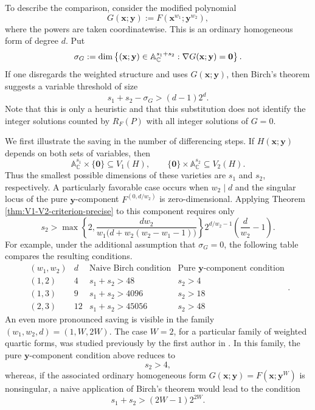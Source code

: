 \documentclass[12pt,reqno]{amsart}
\theoremstyle{definition}
\theoremstyle{remark}
\numberwithin{equation}{section}
\def\bfx{{\mathbf x}}
\def\bfy{{\mathbf y}}
\def\C{{\mathbb C}}\def\D{{\mathbb D}}
\def\A{{\mathbb A}}
\begin{document}
To describe the comparison, consider the modified polynomial
\[
G(\bfx;\bfy):=F(\bfx^{w_1};\bfy^{w_2}),
\]
where the powers are taken coordinatewise.  This is an ordinary homogeneous
form of degree $d$. Put
\[
\sigma_G:=
\dim\left\{(\bfx;\bfy)\in\A_{\C}^{s_1+s_2}:
\nabla G(\bfx;\bfy)=\bf0\right\}.
\]
If one disregards the weighted structure and uses $G(\bfx;\bfy)$, then
Birch's theorem suggests a variable threshold of size
\[
    s_1+s_2-\sigma_G>(d-1)2^d.
\]
Note that this is only a heuristic and that this substitution does not identify the integer
solutions counted by $R_F(P)$ with all integer solutions of $G=0$.

We first illustrate the saving in the number of differencing steps. If
$H(\bfx;\bfy)$ depends on both sets of variables, then
\[
\A_{\C}^{s_1}\times\{\mathbf 0\}\subseteq V_1(H),
\qquad
\{\mathbf 0\}\times\A_{\C}^{s_2}\subseteq V_2(H).
\]
Thus the smallest possible dimensions of these varieties are $s_1$ and
$s_2$, respectively. A particularly favorable case occurs when $w_2\mid d$
and the singular locus of the pure $\bfy$-component
$F^{(0,d/w_2)}$ is zero-dimensional. Applying Theorem
\ref{thm:V1-V2-criterion-precise} to this component requires only
\[
s_2>
\max\left\{2,
\frac{dw_2}{w_1\bigl(d+w_2(w_2-w_1-1)\bigr)}\right\}
2^{d/w_2-1}\left(\frac d{w_2}-1\right).
\]
For example, under the additional assumption that $\sigma_G=0$, the following
table compares the resulting conditions.
\[
\begin{array}{c|c|c|c}
(w_1,w_2) & d & \text{Naive Birch condition}
& \text{Pure $\bfy$-component condition}\\ \hline
(1,2) & 4  & s_1+s_2>48    & s_2>4\\
(1,3) & 9  & s_1+s_2>4096  & s_2>18\\
(2,3) & 12 & s_1+s_2>45056 & s_2>48
\end{array}.
\]
An even more pronounced saving is visible in the family
$(w_1,w_2,d)=(1,W,2W)$.  The case $W=2$, for a particular family of
weighted quartic forms, was studied previously by the first author in
\cite{Flores2024}. In this family, the pure $\bfy$-component condition above
reduces to
\[
    s_2>4,
\]
whereas, if the associated ordinary homogeneous form
$G(\bfx;\bfy)=F(\bfx;\bfy^W)$ is nonsingular, a naive application of Birch's
theorem would lead to the condition
\[
    s_1+s_2>(2W-1)2^{2W}.
\]
\end{document}
